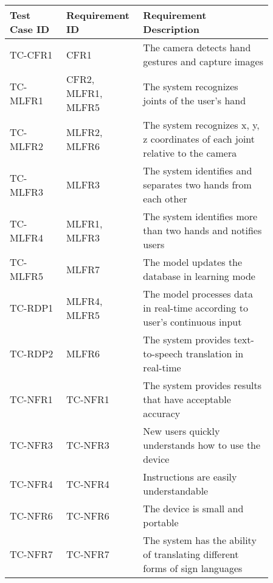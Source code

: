 \documentclass[12pt]{article}
\begin{document}
\renewcommand{\arraystretch}{1.2}
\noindent \begin{tabularx}{\textwidth}{p{0.2\linewidth}|p{0.2\linewidth}|p{0.46\linewidth}}
\toprule
\textbf{Test Case ID} & \textbf{Requirement ID} & \textbf{Requirement Description}\\
\midrule
TC-CFR1 & CFR1 & The camera detects hand gestures and capture images\\ \hline
TC-MLFR1 & CFR2, MLFR1, MLFR5 & The system recognizes joints of the user’s hand\\ \hline
TC-MLFR2 & MLFR2, MLFR6 & The system recognizes x, y, z coordinates of each joint relative to the camera\\ \hline
TC-MLFR3 & MLFR3 & The system identifies and separates two hands from each other\\ \hline
TC-MLFR4 & MLFR1, MLFR3 & The system identifies more than two hands and notifies users\\ \hline
TC-MLFR5 & MLFR7 & The model updates the database in learning mode\\ \hline
TC-RDP1 & MLFR4, MLFR5 & The model processes data in real-time according to user’s continuous input\\ \hline
TC-RDP2 & MLFR6 & The system provides text-to-speech translation in real-time\\ \hline
TC-NFR1 & TC-NFR1 & The system provides results that have acceptable accuracy\\ \hline
TC-NFR3 & TC-NFR3 & New users quickly understands how to use the device\\ \hline
TC-NFR4 & TC-NFR4 & Instructions are easily understandable\\ \hline
TC-NFR6 & TC-NFR6 & The device is small and portable\\ \hline
TC-NFR7 & TC-NFR7 & The system has the ability of translating different forms of sign languages\\
\bottomrule
\end{tabularx}

\newpage


\end{document}
